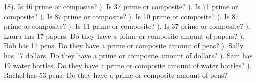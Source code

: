 \documentclass{article}%
\begin{document}
18). Is 46 prime or composite?%
\newline%
\newline%
). Is 37 prime or composite?%
\newline%
\newline%
). Is 71 prime or composite?%
\newline%
\newline%
). Is 87 prime or composite?%
\newline%
\newline%
). Is 10 prime or composite?%
\newline%
\newline%
). Is 87 prime or composite?%
\newline%
\newline%
). Is 11 prime or composite?%
\newline%
\newline%
). Is 37 prime or composite?%
\newline%
\newline%
). Laura has 17 papers. Do they have a prime or composite amount of papers?%
\newline%
\newline%
). Bob has 17 pens. Do they have a prime or composite amount of pens?%
\newline%
\newline%
). Sally has 17 dollars. Do they have a prime or composite amount of dollars?%
\newline%
\newline%
). Sam has 19 water bottles. Do they have a prime or composite amount of water bottles?%
\newline%
\newline%
). Rachel has 53 pens. Do they have a prime or composite amount of pens?%
\newline%
\newline%
\newline%
\end{document}
